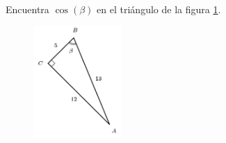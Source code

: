 \question[15] Encuentra $\cos(\beta)$ en el triángulo de la figura \ref{fig:functrig03}.
\begin{figure}[H]
    \begin{center}
        \includegraphics[width=0.3\textwidth]{../images/functrig03.png}
    \end{center}
    \caption{}
    \label{fig:functrig03}
\end{figure}
